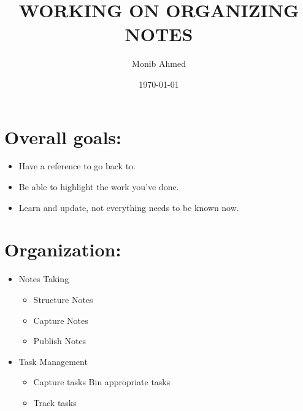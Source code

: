 \documentclass[11pt]{article}
\author{Monib Ahmed}
\date{\today}
\title{WORKING ON ORGANIZING NOTES}
\begin{document}
\maketitle
\tableofcontents


\section{Overall goals:}
\label{sec:org01c4e63}
\begin{itemize}
\item Have a reference to go back to.
\item Be able to highlight the work you've done.
\item Learn and update, not everything needs to be known now.
\end{itemize}

\section{Organization:}
\label{sec:org7cdce0f}
\begin{itemize}
\item Notes Taking
\begin{itemize}
\item Structure Notes
\item Capture Notes
\item Publish Notes
\end{itemize}
\item Task Management
\begin{itemize}
\item Capture tasks Bin appropriate tasks
\item Track tasks
\end{itemize}
\end{itemize}
\end{document}
